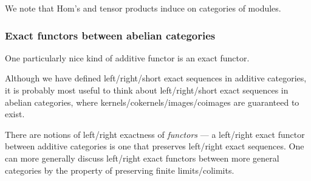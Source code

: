 


We note that Hom's and tensor products induce  on categories of modules.



\subsubsection{Exact functors between abelian categories}

One particularly nice kind of additive functor is an exact functor.






Although we have defined left/right/short exact sequences in additive categories, it is probably most useful to think about left/right/short exact sequences in abelian categories, where kernels/cokernels/images/coimages are guaranteed to exist.









There are notions of left/right exactness of \emph{functors} --- a left/right exact functor between additive categories is one that preserves left/right exact sequences. One can more generally discuss left/right exact functors between more general categories by the property of preserving finite limits/colimits.






